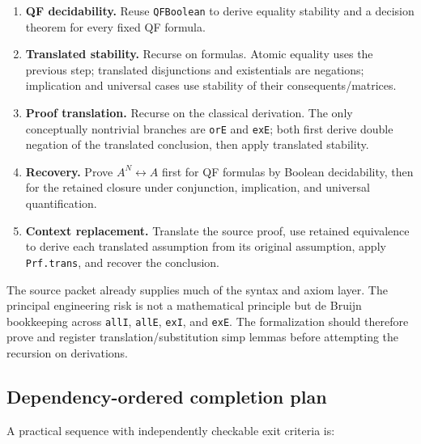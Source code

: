 \begin{enumerate}[label=(\arabic*)]
\item \textbf{QF decidability.}  Reuse \texttt{QFBoolean} to derive equality stability and a decision theorem for every fixed QF formula.
\item \textbf{Translated stability.}  Recurse on formulas.  Atomic equality uses the previous step; translated disjunctions and existentials are negations; implication and universal cases use stability of their consequents/matrices.
\item \textbf{Proof translation.}  Recurse on the classical derivation.  The only conceptually nontrivial branches are \texttt{orE} and \texttt{exE}; both first derive double negation of the translated conclusion, then apply translated stability.
\item \textbf{Recovery.}  Prove \(A^N\leftrightarrow A\) first for QF formulas by Boolean decidability, then for the retained closure under conjunction, implication, and universal quantification.
\item \textbf{Context replacement.}  Translate the source proof, use retained equivalence to derive each translated assumption from its original assumption, apply \texttt{Prf.trans}, and recover the conclusion.
\end{enumerate}

The source packet already supplies much of the syntax and axiom layer.  The principal engineering risk is not a mathematical principle but de Bruijn bookkeeping across \texttt{allI}, \texttt{allE}, \texttt{exI}, and \texttt{exE}.  The formalization should therefore prove and register translation/substitution simp lemmas before attempting the recursion on derivations.

\subsection{Dependency-ordered completion plan}

A practical sequence with independently checkable exit criteria is:

